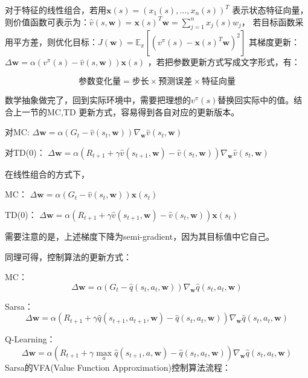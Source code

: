 \documentclass[UTF8]{ctexart}
\begin{document}
对于特征的线性组合，若用$\mathbf{x}(s)=\left(x_{1}(s), \ldots, x_{n}(s)\right)^{T}$
表示状态特征向量，则价值函数可表示为：$\hat{v}(s, \mathbf{w})=\mathbf{x}(s)^{T} \mathbf{w}=\sum_{j=1}^{n} x_{j}(s) w_{j}$，
若目标函数采用平方差，则优化目标：$J(\mathbf{w})=\mathbb{E}_{\pi}\left[\left(v^{\pi}(s)-\mathbf{x}(s)^{T} \mathbf{w}\right)^{2}\right]$
其梯度更新：$\Delta \mathbf{w}=\alpha\left(v^{\pi}(s)-\hat{v}(s, \mathbf{w})\right) \mathbf{x}(s)$
，若把参数更新方式写成文字形式，有：

$$\textbf{参数变化量} = \textbf{步长} \times \textbf{预测误差} \times \textbf{特征向量}$$

数学抽象做完了，回到实际环境中，需要把理想的$v^{\pi}(s)$替换回实际中的值。结合上一节的MC,TD
更新方式，容易得到各自对应的更新版本。

对MC: 
$\Delta \mathbf{w}=\alpha\left(G_{t}-\hat{v}(s_t, \mathbf{w})\right) \nabla_{\mathbf{w}} \hat{v}\left(s_{t}, \mathbf{w}\right)$

对TD(0)：
$\Delta \mathbf{w}=\alpha\left(R_{t+1} + \gamma \hat{v}(s_{t+1}, \mathbf{w})-\hat{v}(s_t, \mathbf{w})\right) \nabla_{\mathbf{w}} \hat{v}\left(s_{t}, \mathbf{w}\right)$

在线性组合的方式下，

MC：
$\Delta \mathbf{w}=\alpha\left(G_{t}-\hat{v}(s_t, \mathbf{w})\right) \mathbf{x}(s_t)$

TD(0)：
$\Delta \mathbf{w}=\alpha\left(R_{t+1} + \gamma \hat{v}(s_{t+1}, \mathbf{w})-\hat{v}(s_t, \mathbf{w})\right)  \mathbf{x}(s_t)$

需要注意的是，上述梯度下降为semi-gradient，因为其目标值中它自己。

同理可得，控制算法的更新方式：

MC：
\begin{equation}\Delta \mathbf{w}=\alpha\left(G_{t}-\hat{q}\left(s_{t}, a_{t}, \mathbf{w}\right)\right) \nabla_{\mathbf{w}} \hat{q}\left(s_{t}, a_{t}, \mathbf{w}\right)\end{equation}

Sarsa：
\begin{equation}\Delta \mathbf{w}=\alpha\left(R_{t+1}+\gamma \hat{q}\left(s_{t+1}, a_{t+1}, \mathbf{w}\right)-\hat{q}\left(s_{t}, a_{t}, \mathbf{w}\right)\right) \nabla_{\mathbf{w}} \hat{q}\left(s_{t}, a_{t}, \mathbf{w}\right)\end{equation}

Q-Learning：
\begin{equation}\Delta \mathbf{w}=\alpha\left(R_{t+1}+\gamma \max _{a} \hat{q}\left(s_{t+1}, a, \mathbf{w}\right)-\hat{q}\left(s_{t}, a_{t}, \mathbf{w}\right)\right) \nabla_{\mathbf{w}} \hat{q}\left(s_{t}, a_{t}, \mathbf{w}\right)\end{equation}
Sarsa的VFA(Value Function Approximation)控制算法流程：
\end{document}
